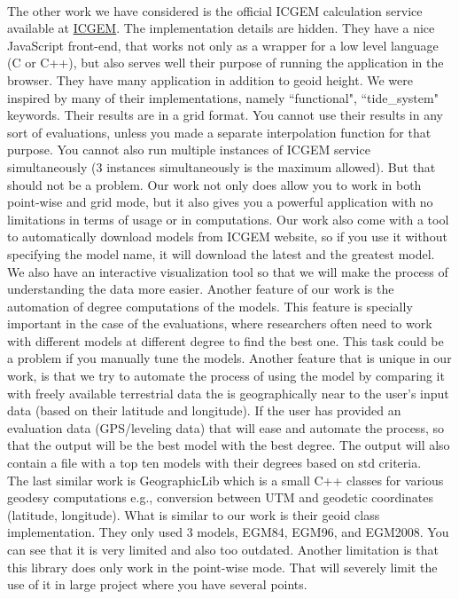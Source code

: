 \\
The other work we have considered is the official ICGEM calculation service available at \href{http://icgem.gfz-potsdam.de/ICGEM/Service.html}{ICGEM}. The implementation details are hidden. They have a nice JavaScript front-end, that works not only as a wrapper for a low level language (C or C++), but also serves well their purpose of running the application in the browser. They have many application in addition to geoid height. We were inspired by many of their implementations, namely ``functional", ``tide\_system" keywords. Their results are in a grid format. You cannot use their results in any sort of evaluations, unless you made a separate interpolation function for that purpose. You cannot also run multiple instances of ICGEM service simultaneously (3 instances simultaneously is the maximum allowed). But that should not be a problem. Our work not only does allow you to work in both point-wise and grid mode, but it also gives you a powerful application with no limitations in terms of usage or in computations. Our work also come with a tool to automatically download models from ICGEM website, so if you use it without specifying the model name, it will download the latest and the greatest model. We also have an interactive visualization tool so that we will make the process of understanding the data more easier. Another feature of our work is the automation of degree computations of the models. This feature is specially important in the case of the evaluations, where researchers often need to work with different models at different degree to find the best one. This task could be a problem if you manually tune the models. Another feature that is unique in our work, is that we try to automate the process of using the model by comparing it with freely available terrestrial data the is geographically near to the user's input data (based on their latitude and longitude). If the user has provided an evaluation data (GPS/leveling data) that will ease and automate the process, so that the output will be the best model with the best degree. The output will also contain a file with a top ten models with their degrees based on std criteria.\\
The last similar work is GeographicLib which is a small C++ classes for various geodesy computations e.g., conversion between UTM and geodetic coordinates (latitude, longitude). What is similar to our work is their geoid class implementation. They only used 3 models,  EGM84, EGM96, and EGM2008. You can see that it is very limited and also too outdated. Another limitation is that this library does only work in the point-wise mode. That will severely limit the use of it in large project where you have several points.  


